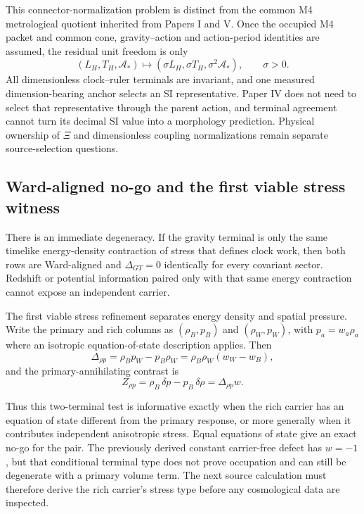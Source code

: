 \documentclass[11pt]{article}
\begin{document}
This connector-normalization problem is distinct from the common M4
metrological quotient inherited from Papers I and V. Once the occupied M4
packet and common cone, gravity--action and action-period identities are
assumed, the residual unit freedom is only
\begin{equation}
 (L_H,T_H,\mathcal A_*)
 \longmapsto
 (\sigma L_H,\sigma T_H,\sigma^2\mathcal A_*),
 \qquad \sigma>0.
 \label{eq:paperiv-m4-metrological-orbit}
\end{equation}
All dimensionless clock--ruler terminals are invariant, and one measured
dimension-bearing anchor selects an SI representative. Paper IV does not need
to select that representative through the parent action, and terminal
agreement cannot turn its decimal SI value into a morphology prediction.
Physical ownership of $\Xi$ and dimensionless coupling normalizations remain
separate source-selection questions.

\subsection{Ward-aligned no-go and the first viable stress witness}

There is an immediate degeneracy. If the gravity terminal is only the same
timelike energy-density contraction of stress that defines clock work, then
both rows are Ward-aligned and \(\Delta_{GT}=0\) identically for every
covariant sector. Redshift or potential information paired only with that
same energy contraction cannot expose an independent carrier.

The first viable stress refinement separates energy density and spatial
pressure. Write the primary and rich columns as
\((\rho_B,p_B)\) and \((\rho_W,p_W)\), with
\(p_a=w_a\rho_a\) where an isotropic equation-of-state description applies.
Then
\begin{equation}
 \Delta_{\rho p}
 =\rho_Bp_W-p_B\rho_W
 =\rho_B\rho_W(w_W-w_B),
 \label{eq:rho-pressure-determinant}
\end{equation}
and the primary-annihilating contrast is
\begin{equation}
 Z_{\rho p}=\rho_B\,\delta p-p_B\,\delta\rho
 =\Delta_{\rho p}w.
 \label{eq:rho-pressure-witness}
\end{equation}

Thus this two-terminal test is informative exactly when the rich carrier has
an equation of state different from the primary response, or more generally
when it contributes independent anisotropic stress. Equal equations of state
give an exact no-go for the pair. The previously derived constant
carrier-free defect has \(w=-1\), but that conditional terminal type does not
prove occupation and can still be degenerate with a primary volume term.
The next source calculation must therefore derive the rich carrier's stress
type before any cosmological data are inspected.
\end{document}
